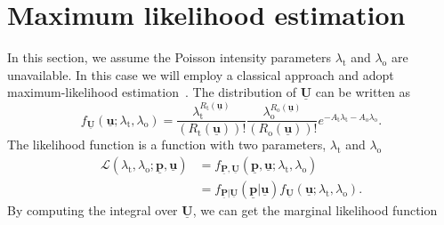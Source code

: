 \section{Maximum likelihood estimation} \label{section:Maxestimation}

In this section, we assume the Poisson intensity parameters $\lambda_{\mathrm{t}}$ and $\lambda_{\mathrm{o}}$ are unavailable.
In this case we will employ a classical approach and adopt maximum-likelihood estimation~\cite{casella2001statistical}.
The distribution of $\underline{\mathbf{U}}$ can be written as
\begin{equation}
f_{\underline{\mathbf{U}}} \left( \underline{\mathbf{u}};
\lambda_{\mathrm{t}}, \lambda_{\mathrm{o}} \right)
= \frac{ \lambda_{\mathrm{t}}^{R_{\mathrm{t}}(\underline{\mathbf{u}})} }
{ ( R_{\mathrm{t}}(\underline{\mathbf{u}}) )! }
\frac{ \lambda_{\mathrm{o}}^{R_{\mathrm{o}}(\underline{\mathbf{u}})} }
{ ( R_{\mathrm{o}}(\underline{\mathbf{u}}) )! }
e^{- A_{\mathrm{t}} \lambda_{\mathrm{t}}
- A_{\mathrm{o}} \lambda_{\mathrm{o}}} .
\end{equation}
The likelihood function is a function with two parameters, $\lambda_{\mathrm{t}}$ and $\lambda_{\mathrm{o}}$
\begin{equation}
\begin{split}
\mathcal{L} \left( \lambda_{\mathrm{t}}, \lambda_{\mathrm{o}};
\underline{\mathbf{p}}, \underline{\mathbf{u}} \right)
&= f_{\underline{\mathbf{P}}, \underline{\mathbf{U}}}
\left( \underline{\mathbf{p}}, \underline{\mathbf{u}};
\lambda_{\mathrm{t}}, \lambda_{\mathrm{o}} \right) \\
&= f_{\underline{\mathbf{P}} | \underline{\mathbf{U}}}
\left( \underline{\mathbf{p}} | \underline{\mathbf{u}} \right)
f_{\underline{\mathbf{U}}} \left( \underline{\mathbf{u}};
\lambda_{\mathrm{t}}, \lambda_{\mathrm{o}} \right) .
\end{split}
\end{equation}
By computing the integral over $\underline{\mathbf{U}}$, we can get the marginal likelihood function
